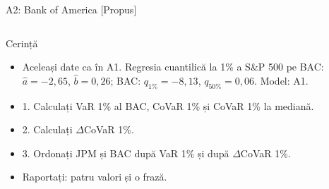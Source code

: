 \begin{frame}{A2: Bank of America [Propus]}
\propsub
\itemsize{\scriptsize}
\begin{columns}[T]
\begin{column}{\taskw}
\begin{block}{Cerință}
\begin{itemize}
    \item Aceleași date ca în A1. Regresia cuantilică la 1\% a S\&P 500 pe BAC: $\hat a = -2{,}65$, $\hat b = 0{,}26$; BAC: $q_{1\%} = -8{,}13$, $q_{50\%} = 0{,}06$. Model: A1.
    \item 1. Calculați VaR 1\% al BAC, CoVaR 1\% și CoVaR 1\% la mediană.
    \item 2. Calculați $\Delta$CoVaR 1\%.
    \item 3. Ordonați JPM și BAC după VaR 1\% și după $\Delta$CoVaR 1\%.
    \item Raportați: patru valori și o frază.
\end{itemize}
\end{block}
\end{column}
\begin{column}{\solw}
\end{column}
\end{columns}
\end{frame}

